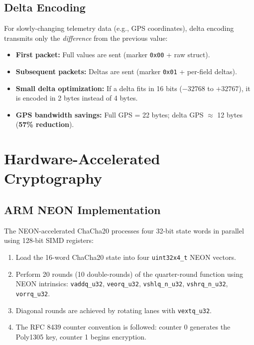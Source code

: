 \documentclass[11pt,a4paper]{article}
\begin{document}
\subsection{Delta Encoding}

For slowly-changing telemetry data (e.g., GPS coordinates), delta encoding transmits only the \emph{difference} from the previous value:

\begin{itemize}[noitemsep]
    \item \textbf{First packet:} Full values are sent (marker \texttt{0x00} + raw struct).
    \item \textbf{Subsequent packets:} Deltas are sent (marker \texttt{0x01} + per-field deltas).
    \item \textbf{Small delta optimization:} If a delta fits in 16 bits ($-32768$ to $+32767$), it is encoded in 2 bytes instead of 4 bytes.
    \item \textbf{GPS bandwidth savings:} Full GPS = 22 bytes; delta GPS $\approx$ 12 bytes (\textbf{57\% reduction}).
\end{itemize}

\section{Hardware-Accelerated Cryptography}

\subsection{ARM NEON Implementation}

The NEON-accelerated ChaCha20 processes four 32-bit state words in parallel using 128-bit SIMD registers:

\begin{enumerate}[noitemsep]
    \item Load the 16-word ChaCha20 state into four \texttt{uint32x4\_t} NEON vectors.
    \item Perform 20 rounds (10 double-rounds) of the quarter-round function using NEON intrinsics: \texttt{vaddq\_u32}, \texttt{veorq\_u32}, \texttt{vshlq\_n\_u32}, \texttt{vshrq\_n\_u32}, \texttt{vorrq\_u32}.
    \item Diagonal rounds are achieved by rotating lanes with \texttt{vextq\_u32}.
    \item The RFC 8439 counter convention is followed: counter 0 generates the Poly1305 key, counter 1 begins encryption.
\end{enumerate}
\end{document}
